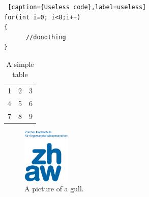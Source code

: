 %
%
\begin{lstlisting} [caption={Useless code},label=useless]
for(int i=0; i<8;i++) 
{
      //donothing
}
\end{lstlisting}


%
%
\cite{Sch96:crypt}


%
%
\begin{table}[h!]
  \begin{center}
    \begin{tabular}{| l c r |}
    \hline
    1 & 2 & 3 \\
    4 & 5 & 6 \\
    7 & 8 & 9 \\
    \hline
    \end{tabular}
  \end{center}
  \caption{A simple table}
\end{table}

%
%
\begin{figure}[h!]
  \centering
    \includegraphics[width=0.2\textwidth]{img/logo_zhaw}
  \caption{A picture of a gull.}
\end{figure}